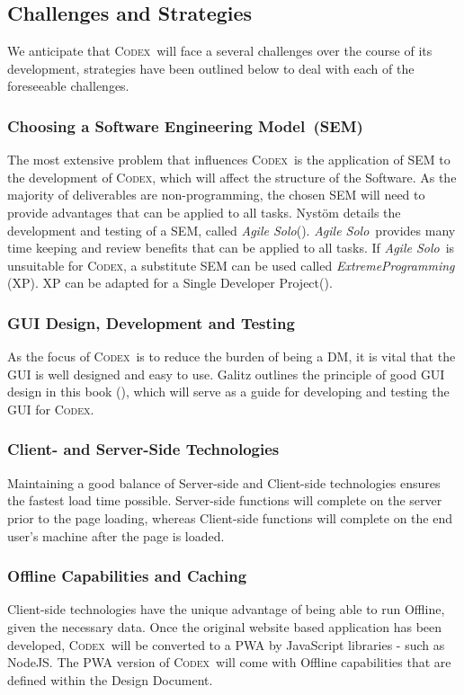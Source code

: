 \documentclass[review]{cmpreport}
\newcommand{\sem}{Software Engineering Model}
\newcommand{\Codex}{\textsc{Codex}}
\newcommand{\AgileSolo}{\emph{Agile Solo}}
\begin{document}
	\subsection{Challenges and Strategies}
	We anticipate that \Codex \ will face a several challenges over the course of its development, strategies have been outlined below to deal with each of the foreseeable challenges.	

	\subsubsection{Choosing a \sem \ (SEM)} 
	The most extensive problem that influences \Codex \ is the application of SEM to the development of \Codex, which will affect the structure of the Software. As the majority of deliverables are non-programming, the chosen SEM will need to provide advantages that can be applied to all tasks. Nyst{\"o}m details the development and testing of a SEM, called \AgileSolo (\cite{AgileSolo}). \AgileSolo \ provides many time keeping and review benefits that can be applied to all tasks. If \AgileSolo \ is unsuitable for \Codex, a substitute SEM can be used called \emph{ExtremeProgramming} (XP). XP can be adapted for a Single Developer Project(\cite{SoloXP}).
	
	\subsubsection{GUI Design, Development and Testing}
	As the focus of \Codex \ is to reduce the burden of being a DM, it is vital that the GUI is well designed and easy to use. Galitz outlines the principle of good GUI design in this book (\cite{GUIDesign}), which will serve as a guide for developing and testing the GUI for \Codex.
	
	\subsubsection{Client- and Server-Side Technologies}
	Maintaining a good balance of Server-side and Client-side technologies ensures the fastest load time possible. Server-side functions will complete on the server prior to the page loading, whereas Client-side functions will complete on the end user's machine after the page is loaded.
	
	\subsubsection{Offline Capabilities and Caching}
	Client-side technologies have the unique advantage of being able to run Offline, given the necessary data. Once the original website based application has been developed, \Codex \ will be converted to a PWA by JavaScript libraries - such as NodeJS. The PWA version of \Codex \ will come with Offline capabilities that are defined within the Design Document.
	
\end{document}
